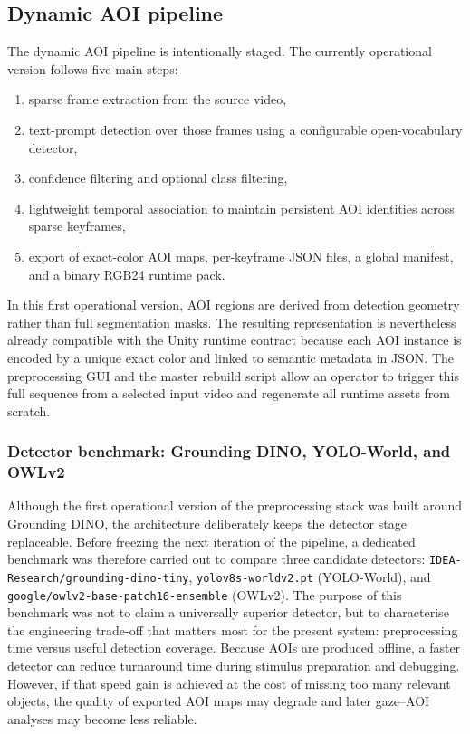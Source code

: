 \documentclass[11pt]{article}
\begin{document}
\subsection{Dynamic AOI pipeline}
The dynamic AOI pipeline is intentionally staged. The currently operational version follows five main steps:

\begin{enumerate}[leftmargin=1.5em]
    \item sparse frame extraction from the source video,
    \item text-prompt detection over those frames using a configurable open-vocabulary detector,
    \item confidence filtering and optional class filtering,
    \item lightweight temporal association to maintain persistent AOI identities across sparse keyframes,
    \item export of exact-color AOI maps, per-keyframe JSON files, a global manifest, and a binary RGB24 runtime pack.
\end{enumerate}

In this first operational version, AOI regions are derived from detection geometry rather than full segmentation masks. The resulting representation is nevertheless already compatible with the Unity runtime contract because each AOI instance is encoded by a unique exact color and linked to semantic metadata in JSON. The preprocessing GUI and the master rebuild script allow an operator to trigger this full sequence from a selected input video and regenerate all runtime assets from scratch.

\subsubsection{Detector benchmark: Grounding DINO, YOLO-World, and OWLv2}

Although the first operational version of the preprocessing stack was built around Grounding DINO, the architecture deliberately keeps the detector stage replaceable. Before freezing the next iteration of the pipeline, a dedicated benchmark was therefore carried out to compare three candidate detectors: \texttt{IDEA-Research/grounding-dino-tiny}, \texttt{yolov8s-worldv2.pt} (YOLO-World), and \texttt{google/owlv2-base-patch16-ensemble} (OWLv2). The purpose of this benchmark was not to claim a universally superior detector, but to characterise the engineering trade-off that matters most for the present system: preprocessing time versus useful detection coverage. Because AOIs are produced offline, a faster detector can reduce turnaround time during stimulus preparation and debugging. However, if that speed gain is achieved at the cost of missing too many relevant objects, the quality of exported AOI maps may degrade and later gaze--AOI analyses may become less reliable.
\end{document}
